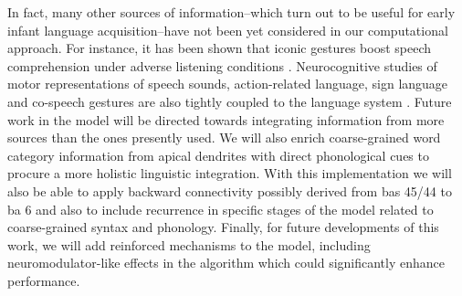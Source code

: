 {In fact, many other sources of information--which turn out to be useful for early infant language acquisition--have not been yet considered in our computational approach. For instance, it has been shown that iconic gestures boost speech comprehension under adverse listening conditions \cite{HOLLE2010875}. Neurocognitive studies of motor representations of speech sounds, action-related language, sign language and co-speech gestures are also tightly coupled to the language system \cite{Willems2007NeuralEF}.
Future work in the model will be directed towards integrating information from more sources than the ones presently used.
We will also enrich coarse-grained word category information from apical dendrites with direct phonological cues to procure a more holistic linguistic integration.
With this implementation we will also be able to apply backward connectivity possibly derived from \glspl{ba} 45/44 to \gls{ba} 6 and also to include recurrence in specific stages of the model related to coarse-grained syntax and phonology.
Finally, for future developments of this work, we will add reinforced mechanisms to the model, including neuromodulator-like effects in the algorithm which could significantly enhance performance.
}
























